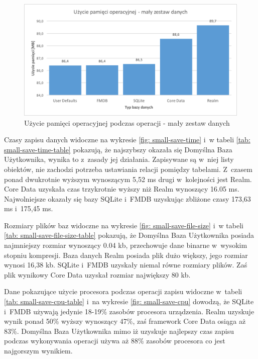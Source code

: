 \begin{figure}[h]
\centering
	\includegraphics[width=15cm]{img/save_data/save_ram_small.png}
	\caption{Użycie pamięci operacyjnej podczas operacji - mały zestaw danych}
	\label{fig: small-save-ram}
\end{figure}

\newpage

Czasy zapisu danych widoczne na wykresie \ref{fig: small-save-time} i~w tabeli \ref{tab: small-save-time-table} pokazują, że najszybszy okazała się Domyślna Baza Użytkownika, wynika to z~zasady jej działania. Zapisywane są w~niej listy obiektów, nie zachodzi potrzeba ustawiania relacji pomiędzy tabelami. Z~czasem ponad dwukrotnie wyższym wynoszącym 5,52 ms drugi w~kolejności jest Realm. Core Data uzyskała czas trzykrotnie wyższy niż Realm wynoszący 16.05 ms. Najwolniejsze okazały się bazy SQLite i~FMDB uzyskując zbliżone czasy 173,63 ms i~175,45 ms. \par 

Rozmiary plików baz widoczne na wykresie \ref{fig: small-save-file-size} i~w tabeli \ref{tab: small-save-file-size-table} pokazują, że Domyślna Baza Użytkownika posiada najmniejszy rozmiar wynoszący 0.04 kb, przechowuje dane binarne w~wysokim stopniu kompresji. Baza danych Realm posiada plik dużo większy, jego rozmiar wynosi 16,38 kb. SQLite i~FMDB uzyskały niemal równe rozmiary plików. Zaś plik wynikowy Core Data uzyskał rozmiar największy 80 kb. \par

Dane pokazujące użycie procesora podczas operacji zapisu widoczne w~tabeli \ref{tab: small-save-cpu-table} i~na wykresie \ref{fig: small-save-cpu} dowodzą, że SQLite i~FMDB używają jedynie 18-19\% zasobów procesora urządzenia. Realm uzyskuje wynik ponad 50\% wyższy wynoszący 47\%, zaś framework Core Data osiąga aż 83\%. Domyślna Baza Użytkownika mimo iż uzyskuje najlepszy czas zapisu podczas wykonywania operacji używa aż 88\% zasobów procesora co jest najgorszym wynikiem.\par 


